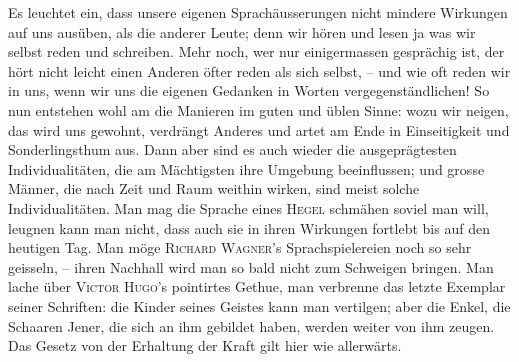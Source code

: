 {Es leuchtet ein, dass unsere eigenen Sprachäusserungen nicht mindere \label{sp.275} Wirkungen auf uns ausüben, als die anderer Leute; denn wir hören und lesen ja  was wir selbst reden und schreiben. Mehr noch, wer nur einigermassen gesprächig ist, der hört nicht leicht einen Anderen öfter reden als sich selbst, – und wie oft reden wir in uns, wenn wir uns die eigenen Gedanken in Worten vergegenständlichen! So nun entstehen wohl am  die Manieren im guten und üblen Sinne: wozu wir neigen, das wird uns gewohnt, verdrängt Anderes und artet am Ende in Einseitigkeit und Sonderlingsthum aus. Dann aber sind es auch wieder die ausgeprägtesten Individualitäten, die am Mächtigsten ihre Umgebung beeinflussen; und grosse Männer, die nach Zeit und Raum weithin wirken, sind meist solche Individualitäten. Man mag die Sprache eines \textsc{Hegel} schmähen soviel man will, leugnen kann man nicht, dass auch sie in ihren Wirkungen fortlebt bis auf den heutigen Tag. Man möge \textsc{Richard} \label{fp.269} \textsc{Wagner}’s Sprachspielereien noch so sehr geisseln, – ihren Nachhall wird man so bald nicht zum Schweigen bringen. Man lache über \textsc{Victor Hugo}’s pointirtes Gethue, man verbrenne das letzte Exemplar seiner Schriften: die Kinder seines Geistes kann man vertilgen; aber die Enkel, die Schaaren Jener, die sich an ihm gebildet haben, werden weiter von ihm zeugen. Das Gesetz von der Erhaltung der Kraft gilt hier wie allerwärts.

}
